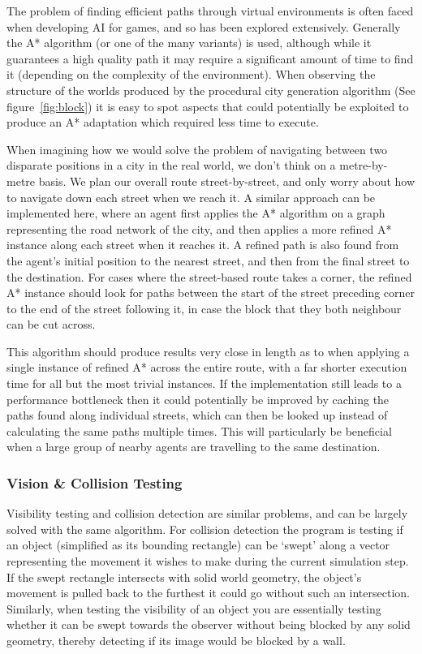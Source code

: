 \documentclass[12pt,a4paper]{article}
\begin{document}
The problem of finding efficient paths through virtual environments is often faced when developing AI for games, and so has been explored extensively. Generally the A* algorithm (or one of the many variants) is used, although while it guarantees a high quality path it may require a significant amount of time to find it (depending on the complexity of the environment). When observing the structure of the worlds produced by the procedural city generation algorithm (See figure~\ref{fig:block}) it is easy to spot aspects that could potentially be exploited to produce an A* adaptation which required less time to execute.

When imagining how we would solve the problem of navigating between two disparate positions in a city in the real world, we don't think on a metre-by-metre basis. We plan our overall route street-by-street, and only worry about how to navigate down each street when we reach it. A similar approach can be implemented here, where an agent first applies the A* algorithm on a graph representing the road network of the city, and then applies a more refined A* instance along each street when it reaches it. A refined path is also found from the agent's initial position to the nearest street, and then from the final street to the destination. For cases where the street-based route takes a corner, the refined A* instance should look for paths between the start of the street preceding corner to the end of the street following it, in case the block that they both neighbour can be cut across.

This algorithm should produce results very close in length as to when applying a single instance of refined A* across the entire route, with a far shorter execution time for all but the most trivial instances. If the implementation still leads to a performance bottleneck then it could potentially be improved by caching the paths found along individual streets, which can then be looked up instead of calculating the same paths multiple times. This will particularly be beneficial when a large group of nearby agents are travelling to the same destination.

\subsubsection{Vision \& Collision Testing}\noindent
Visibility testing and collision detection are similar problems, and can be largely solved with the same algorithm. For collision detection the program is testing if an object (simplified as its bounding rectangle)
can be `swept' along a vector representing the movement it wishes to make during the current simulation step. If the swept rectangle intersects with solid world geometry, the object's movement is pulled back to the furthest it could go without such an intersection. Similarly, when testing the visibility of an object you are essentially testing whether it can be swept towards the observer without being blocked by any solid geometry, thereby detecting if its image would be blocked by a wall.
\end{document}
